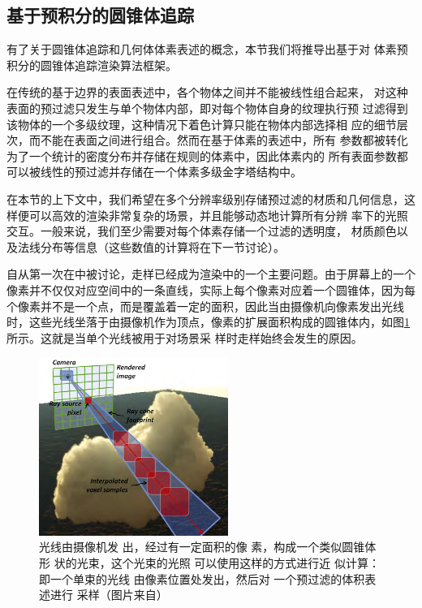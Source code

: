 \subsection{基于预积分的圆锥体追踪}\label{sec:vct-pre-integration-based-cone-tracing}
有了关于圆锥体追踪和几何体体素表述的概念，本节我们将推导出基于对 体素预积分的圆锥体追踪渲染算法框架。

在传统的基于边界的表面表述中，各个物体之间并不能被线性组合起来， 对这种表面的预过滤只发生与单个物体内部，即对每个物体自身的纹理执行预 过滤得到该物体的一个多级纹理，这种情况下着色计算只能在物体内部选择相 应的细节层次，而不能在表面之间进行组合。然而在基于体素的表述中，所有 参数都被转化为了一个统计的密度分布并存储在规则的体素中，因此体素内的 所有表面参数都可以被线性的预过滤并存储在一个体素多级金字塔结构中。

在本节的上下文中，我们希望在多个分辨率级别存储预过滤的材质和几何信息，这样便可以高效的渲染非常复杂的场景，并且能够动态地计算所有分辨 率下的光照交互。一般来说，我们至少需要对每个体素存储一个过滤的透明度， 材质颜色以及法线分布等信息（这些数值的计算将在下一节讨论）。

自从第一次在\cite{a:Thealiasingproblemincomputer-generatedshadedimages}中被讨论，走样已经成为渲染中的一个主要问题。由于屏幕上的一个像素并不仅仅对应空间中的一条直线，实际上每个像素对应着一个圆锥体，因为每个像素并不是一个点，而是覆盖着一定的面积，因此当由摄像机向像素发出光线时，这些光线坐落于由摄像机作为顶点，像素的扩展面积构成的圆锥体内，如图\ref{f:vct-6-1}所示。这就是当单个光线被用于对场景采 样时走样始终会发生的原因。

\begin{figure}
\sidecaption
	\includegraphics[width=0.55\textwidth]{figures/vct/vct-6-1}
	\caption{光线由摄像机发 出，经过有一定面积的像 素，构成一个类似圆锥体形 状的光束，这个光束的光照 可以使用这样的方式进行近 似计算：即一个单束的光线 由像素位置处发出，然后对 一个预过滤的体积表述进行 采样（图片来自\cite{a:InteractiveIndirectIlluminationUsingVoxelConeTracing}）}
	\label{f:vct-6-1}
\end{figure}

